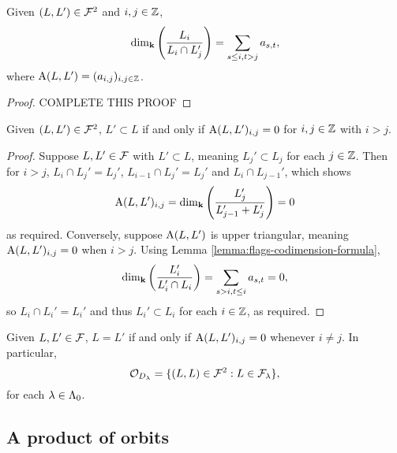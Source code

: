 \documentclass[a4paper, 11pt]{report}
\begin{document}
\begin{lemma}\label{lemma:flags-codimension-formula}
Given $(L,L')\in\mathcal{F}^2$ and $i,j\in\mathbb{Z}$,
\begin{equation*}
\dim_{\mathbf{k}}\left(\frac{L_i}{L_i\cap L_j'}\right) = \sum_{s\le i, t>j} a_{s,t},
\end{equation*}
where $\operatorname{A}(L,L')=(a_{i,j})_{i,j\in\mathbb{Z}}$.
\end{lemma}
\begin{proof}
{\color{red}COMPLETE THIS PROOF}	
\end{proof}

\begin{lemma}
Given $(L,L')\in\mathcal{F}^2$, $L'\subset L$ if and only if $\operatorname{A}(L,L')_{i,j}=0$ for $i,j\in\mathbb{Z}$ with $i>j$.
\end{lemma}
\begin{proof}
Suppose $L,L'\in\mathcal{F}$ with $L'\subset L$, meaning $L_j'\subset L_j$ for each $j\in\mathbb{Z}$. Then for $i>j$, $L_i\cap L_j' = L_j'$, $L_{i-1}\cap L_j' = L_j'$ and $L_i\cap L_{j-1}'$, which shows
\begin{equation*}
\operatorname{A}(L,L')_{i,j} = \dim_{\mathbf{k}}\left(\frac{L_j'}{L_{j-1}'+L_j'}\right) = 0
\end{equation*}
as required. Conversely, suppose $\operatorname{A}(L,L')$ is upper triangular, meaning $\operatorname{A}(L,L')_{i,j}=0$ when $i>j$. Using Lemma \ref{lemma:flags-codimension-formula},
\begin{equation*}
\dim_{\mathbf{k}}\left(\frac{L_i'}{L_i'\cap L_i}\right) = \sum_{s>i,t\le i} a_{s,t} = 0,
\end{equation*}
so $L_i\cap L_i' = L_i'$ and thus $L_i'\subset L_i$ for each $i\in\mathbb{Z}$, as required.
\end{proof}

\begin{corollary}\label{corollary:diagonal-orbits}
Given $L,L'\in\mathcal{F}$, $L=L'$ if and only if $\operatorname{A}(L,L')_{i,j}=0$ whenever $i\neq j$. In particular,
\begin{equation*}
\mathcal{O}_{D_\lambda} = \{(L,L)\in\mathcal{F}^2: L\in\mathcal{F}_\lambda\},
\end{equation*}
for each $\lambda\in{\Lambda_0}$.
\end{corollary}

\subsection{A product of orbits}
\end{document}
